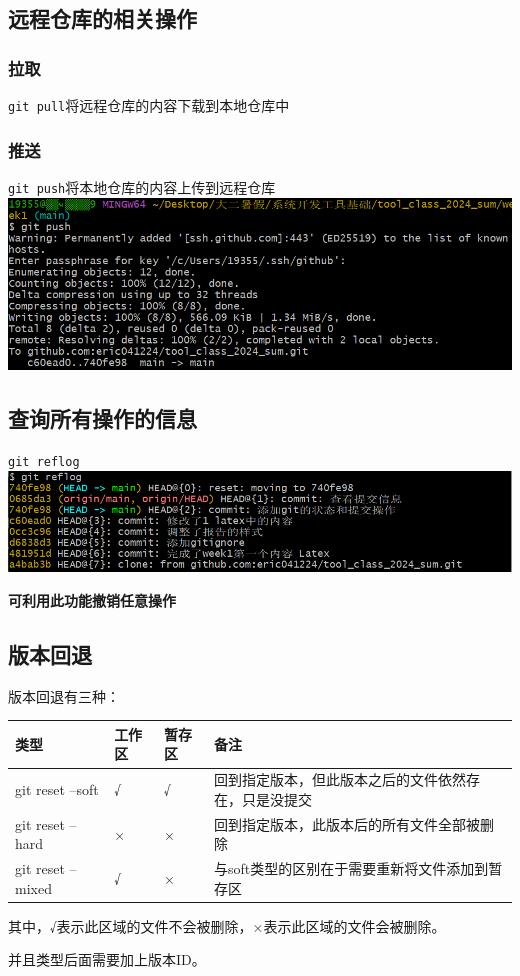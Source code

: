 \documentclass[UTF8]{ctexart}
\begin{document}
\subsection{远程仓库的相关操作}
\subsubsection{拉取}
\verb|git pull|\quad 将远程仓库的内容下载到本地仓库中
\subsubsection{推送}
\verb|git push|\quad 将本地仓库的内容上传到远程仓库\\
\includegraphics[width=1\textwidth]{push.png}

\subsection{查询所有操作的信息}
\verb|git reflog|\\
\includegraphics[width=1\textwidth]{reflog.png}\par
\textbf{可利用此功能撤销任意操作}
\subsection{版本回退}
版本回退有三种：\par
\begin{table}[H]
    \centering
    \begin{tabular}{|>{\centering\arraybackslash}p{3cm}|>{\centering\arraybackslash}p{1.5cm}|>{\centering\arraybackslash}p{1.5cm}|>{\centering\arraybackslash}p{5cm}|}
        \hline
        类型 & 工作区 & 暂存区 & 备注\\
        \hline
        git reset --soft & √ & √ & 回到指定版本，但此版本之后的文件依然存在，只是没提交\\
        \hline
        git reset --hard & × & × & 回到指定版本，此版本后的所有文件全部被删除\\
        \hline
        git reset --mixed & √ & × & 与soft类型的区别在于需要重新将文件添加到暂存区\\
        \hline
    \end{tabular}
\end{table}
其中，√表示此区域的文件不会被删除，×表示此区域的文件会被删除。\par
并且类型后面需要加上版本ID。
\end{document}
